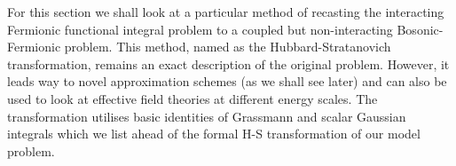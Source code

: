 \documentclass[notitlepage,onecolumn,showpacs,11pt]{revtex4-1}
\begin{document}
For this section we shall look at a particular method of recasting the interacting Fermionic functional integral problem
to a coupled but non-interacting Bosonic-Fermionic problem. This method, named as the Hubbard-Stratanovich transformation, 
remains an exact description of the original problem. However, it leads way to novel approximation schemes (as we 
shall see later) and can also be used to look at effective field theories at different energy scales. The transformation 
utilises basic identities of Grassmann and scalar Gaussian integrals which we list ahead of the formal H-S transformation of our
model problem.
\end{document}
